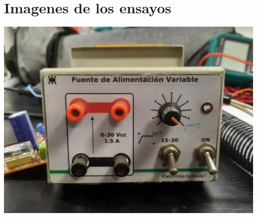 \section{Imagenes de los ensayos}

\begin{center}
    \centering
    \includegraphics[width=0.9\linewidth]{./imagenes/banco_prueba_frente.jpg}
\end{center}

